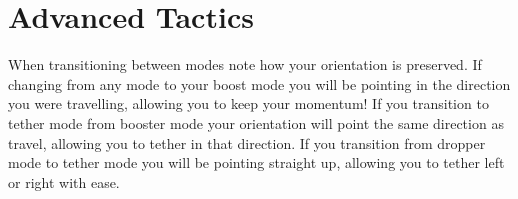 \documentclass[10pt,a4paper]{article}
\begin{document}
\section{Advanced Tactics}

When transitioning between modes note how your orientation is preserved. If changing from any mode to your boost mode you will be pointing in the direction you were travelling, allowing you to keep your momentum! If you transition to tether mode from booster mode your orientation will point the same direction as travel, allowing you to tether in that direction. If you transition from dropper mode to tether mode you will be pointing straight up, allowing you to tether left or right with ease.
\end{document}

